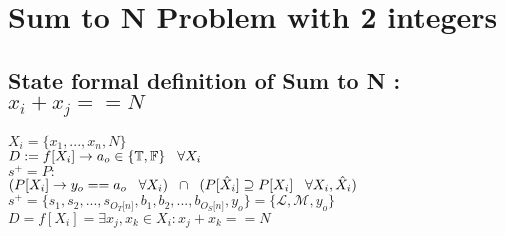 \documentclass[11pt]{article}
\begin{document}
\newpage
\section{Sum to N Problem with 2 integers}
\subsection{State formal definition of Sum to N : $x_i + x_j == N$}
\begin{center}
\vspace{1.5mm}
$
X_i = \{x_1,...,x_n,N\}
$
\\ \vspace{2mm}
$
D := f \lbrack X_i \rbrack \rightarrow a_{o} \in \{\mathbb{T}, \mathbb{F}\} \hspace{3mm} \forall X_i
$
\\ \vspace{2mm}
$
s^+ = P :
$
\\ \vspace{2mm}
$
(P \lbrack X_i \rbrack \rightarrow y_{o} == a_{o} \hspace{3mm} \forall X_i) \hspace{2mm} \cap \hspace{2mm} (P[\hat{X}_i] \supseteq P[X_i] \hspace{3mm} \forall X_i,\hat{X}_i)
$
\\ \vspace{2mm}
$
s^+ = \{ s_1,s_2,...,s_{O_T \lbrack n \rbrack }, b_1, b_2,...,b_{O_S \lbrack n \rbrack},y_o \} = \{ \mathcal{L},\mathcal{M},y_o\}
$
\\ \vspace{6mm}
$
D = f[X_i] = \exists x_j,x_k \in X_i : x_j + x_k == N
$
\end{center}
\end{document}
